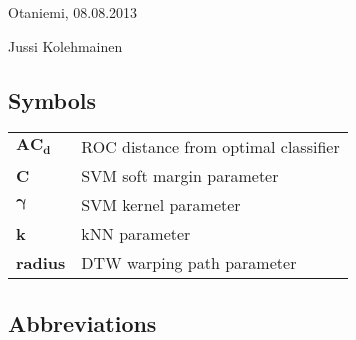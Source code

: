\documentclass[english,12pt,a4paper,pdftex]{report}
\begin{document}
\vspace{5cm}
Otaniemi, 08.08.2013

\vspace{5mm}
{\hfill Jussi Kolehmainen \hspace{1cm}}


\newpage
%

\tableofcontents

\subsection*{Symbols}

\begin{tabular}{ll}
$\mathbf{AC_d}$ & ROC distance from optimal classifier \\
\textbf{C} & SVM soft margin parameter \\
$\mathbf{\gamma}$ & SVM kernel parameter \\
\textbf{k} & kNN parameter \\
\textbf{radius} & DTW warping path parameter \\
\end{tabular}



\subsection*{Abbreviations}
\end{document}
